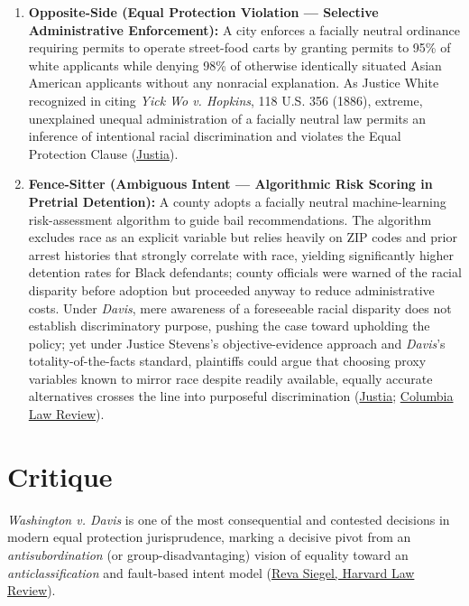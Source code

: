 \documentclass[12pt]{article}
\begin{document}
\begin{enumerate}
\item \textbf{Opposite-Side (Equal Protection Violation --- Selective Administrative Enforcement):} A city enforces a facially neutral ordinance requiring permits to operate street-food carts by granting permits to 95\% of white applicants while denying 98\% of otherwise identically situated Asian American applicants without any nonracial explanation. As Justice White recognized in citing \textit{Yick Wo v. Hopkins}, 118 U.S. 356 (1886), extreme, unexplained unequal administration of a facially neutral law permits an inference of intentional racial discrimination and violates the Equal Protection Clause (\href{https://supreme.justia.com/cases/federal/us/426/229/}{Justia}).

\item \textbf{Fence-Sitter (Ambiguous Intent --- Algorithmic Risk Scoring in Pretrial Detention):} A county adopts a facially neutral machine-learning risk-assessment algorithm to guide bail recommendations. The algorithm excludes race as an explicit variable but relies heavily on ZIP codes and prior arrest histories that strongly correlate with race, yielding significantly higher detention rates for Black defendants; county officials were warned of the racial disparity before adoption but proceeded anyway to reduce administrative costs. Under \textit{Davis}, mere awareness of a foreseeable racial disparity does not establish discriminatory purpose, pushing the case toward upholding the policy; yet under Justice Stevens's objective-evidence approach and \textit{Davis}'s totality-of-the-facts standard, plaintiffs could argue that choosing proxy variables known to mirror race despite readily available, equally accurate alternatives crosses the line into purposeful discrimination (\href{https://supreme.justia.com/cases/federal/us/426/229/}{Justia}; \href{https://www.columbialawreview.org/content/process-scrutiny-motivational-inquiry-and-constitutional-rights/}{Columbia Law Review}).
\end{enumerate}

\section{Critique}

\textit{Washington v. Davis} is one of the most consequential and contested decisions in modern equal protection jurisprudence, marking a decisive pivot from an \textit{antisubordination} (or group-disadvantaging) vision of equality toward an \textit{anticlassification} and fault-based intent model (\href{https://law.yale.edu/sites/default/files/documents/pdf/Faculty/Siegel_TheSupremeCourt2012TermForwardEqualityDivided.pdf}{Reva Siegel, Harvard Law Review}).
\end{document}
